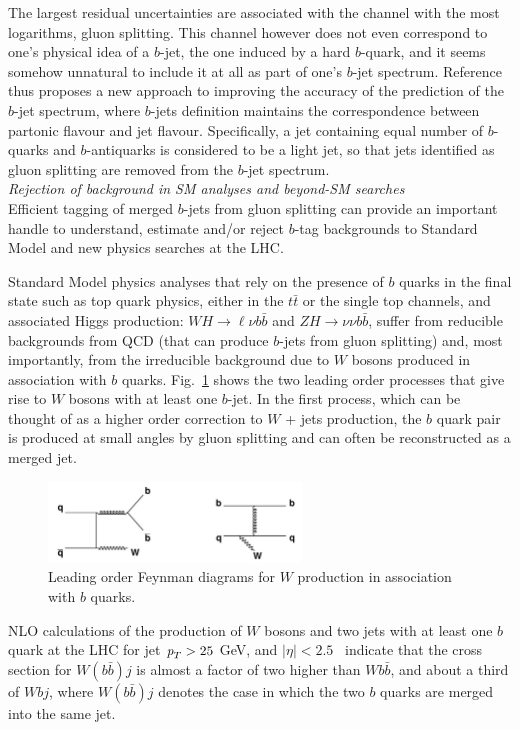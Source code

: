 The largest residual uncertainties are associated with the channel with the
most logarithms, gluon splitting. This channel however does not even correspond
to one's physical idea of a $b$-jet, \ie the one induced by a hard $b$-quark, and it
seems somehow unnatural to include it at all as part of one's $b$-jet spectrum.
Reference~\cite{Salam.AccurateHQ} thus proposes a new approach to improving the accuracy of the prediction of
the $b$-jet spectrum, where $b$-jets definition maintains the correspondence
between partonic flavour and jet flavour. Specifically, a jet containing equal
number of $b$-quarks and $b$-antiquarks is considered to be a light jet, so
that jets identified as gluon splitting are removed from the $b$-jet spectrum. %
%
\\[5mm]
{\em Rejection of background in SM analyses and beyond-SM searches}
\\[5mm]
Efficient tagging of merged $b$-jets from gluon splitting can provide an important handle to understand, estimate and/or reject $b$-tag backgrounds to Standard Model and new physics searches at the LHC.

Standard Model physics analyses that rely on the presence of $b$ quarks in the final state such as top quark physics, either in the $t\bar{t}$ or the single top channels, and associated
Higgs production: $WH\rightarrow\ell\nu b\bar{b}$ and $ZH\rightarrow\nu\nu
b\bar{b}$, suffer from reducible backgrounds from QCD (that can produce $b$-jets from gluon splitting) and, most importantly, from the irreducible background due to  
$W$ bosons produced in association with $b$ quarks.  Fig.~\ref{fig:Wplusb} shows
the two leading order processes that give rise to $W$ bosons with at least one
$b$-jet. In the first process, which can be thought of as a higher order correction to $W$ + jets production, the $b$ quark pair is produced at small angles by gluon
splitting and can often be reconstructed as a merged jet.
\begin{figure}[hp]
\centering
\includegraphics[width=0.6\textwidth]{FIGS/Wbb_diagram.jpg}
\caption{Leading order Feynman diagrams for $W$ production in association with $b$ quarks.}
\label{fig:Wplusb}
\end{figure}
NLO calculations of the production of $W$ bosons and two jets with at least one $b$ quark at the LHC for jet ${\emph{p}_{T}} > 25$ GeV, and $|\eta| < 2.5$~\cite{Campbell:2006} indicate that the cross section for $W(b\bar{b})j$ is almost a factor of two higher than $Wb\bar{b}$, and about a third of $Wbj$, where  $W(b\bar{b})j$ denotes the case in which the two $b$ quarks are merged into the same jet. 

